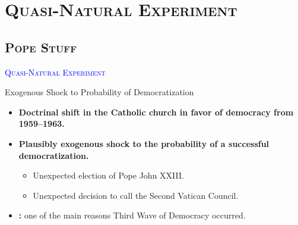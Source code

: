 
\section{\scshape Quasi-Natural Experiment}

\subsection{\scshape Pope Stuff}


\begin{frame}[noframenumbering] 
	\begin{center}
		{ \Huge \textcolor{blue}{\scshape Quasi-Natural Experiment \\
		}}
	\end{center}
\end{frame}


\begin{frame}[label=home2]{Exogenous Shock to Probability of Democratization}
	\begin{itemize}
		\item<1-> \textbf{Doctrinal shift in the Catholic church in favor of democracy from 1959--1963.}
		\vspace{.5cm}
		\item<2-> \textbf{Plausibly exogenous shock to the probability of a successful democratization.}
		\begin{itemize}
			\item<2->[--] Unexpected election of Pope John XXIII.
			\vspace{.1cm}
			\item<2->[--] Unexpected decision to call the Second Vatican Council.
		\end{itemize}				
		 \hyperlink{popeQuotes<1>}{}
		\vspace{.5cm}
		\item<3-> \textbf{\cite{Huntington1991}:} one of the main reasons Third Wave of Democracy occurred. 
	\end{itemize}
\end{frame}


